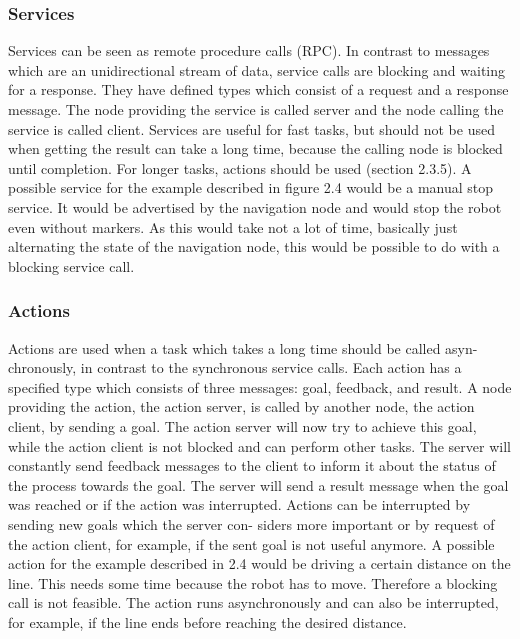 \subsubsection*{Services}
Services  can  be  seen  as  remote  procedure  calls  (RPC).  In  contrast  to  messages
which are an unidirectional stream of data,  service calls are blocking and waiting
for a response.  They have defined types which consist of a request and a response
message.  The node providing the service is called server and the node calling the
service  is  called  client.   Services  are  useful  for  fast  tasks,  but  should  not  be  used
when getting the result can take a long time,  because the calling node is blocked
until completion.  For longer tasks, actions should be used (section 2.3.5).  A possible
service for the example described in figure 2.4 would be a manual stop service.  It
would be advertised by the navigation node and would stop the robot even without
markers.  As this would take not a lot of time, basically just alternating the state of
the navigation node, this would be possible to do with a blocking service call.

\subsubsection*{Actions}
Actions  are  used  when  a  task  which  takes  a  long  time  should  be  called  asyn-
chronously, in contrast to the synchronous service calls.  Each action has a specified
type which consists of three messages:  goal, feedback, and result.  A node providing
the action, the action server, is called by another node, the action client, by sending
a goal.  The action server will now try to achieve this goal, while the action client is
not blocked and can perform other tasks.  The server will constantly send feedback
messages to the client to inform it about the status of the process towards the goal.
The server will send a result message when the goal was reached or if the action was
interrupted.  Actions can be interrupted by sending new goals which the server con-
siders more important or by request of the action client, for example, if the sent goal
is not useful anymore.  A possible action for the example described in 2.4 would be
driving a certain distance on the line.  This needs some time because the robot has
to move.  Therefore a blocking call is not feasible.  The action runs asynchronously
and can also be interrupted, for example, if the line ends before reaching the desired
distance.

